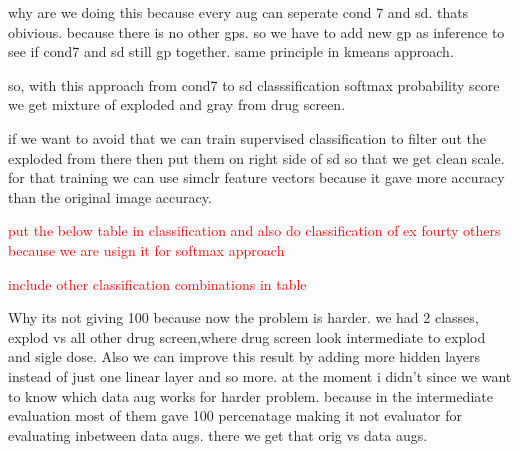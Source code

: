 why are we doing this because every aug can  seperate cond 7 and sd. thats obivious. because there is no other gps. so we have to add new gp as inference to see if 
cond7 and sd still gp together. same principle in kmeans approach.

so, with this approach from cond7 to sd classsification softmax probability score we get mixture of exploded and gray from drug screen.

if we want to avoid that we can train supervised classification to filter out the exploded from there then put them on right side of sd so that we get clean scale.
for that training we can use simclr feature vectors because it gave more accuracy than the original image accuracy.

\textcolor{red}{put the below table in classification and also do classification of ex fourty others because we are usign it for softmax approach} 

\begin{table}[H]
  \centering
  \caption{Performance metrics for different augmentation strategies before the projection head.}
  \label{tab:augmentation}
\end{table}

\textcolor{red}{include other classification combinations in table}

Why its not giving 100 because now the problem is harder. we had 2 classes, explod vs all other drug screen,where drug screen look intermediate to explod and sigle dose.
Also we can improve this result by adding more hidden layers instead of just one linear layer and so more. at the moment i didn't since we want to know which data aug works for harder problem.
because in the intermediate evaluation  most of them gave 100 percenatage making it not  evaluator for evaluating inbetween data augs. there we get that orig vs data augs.

